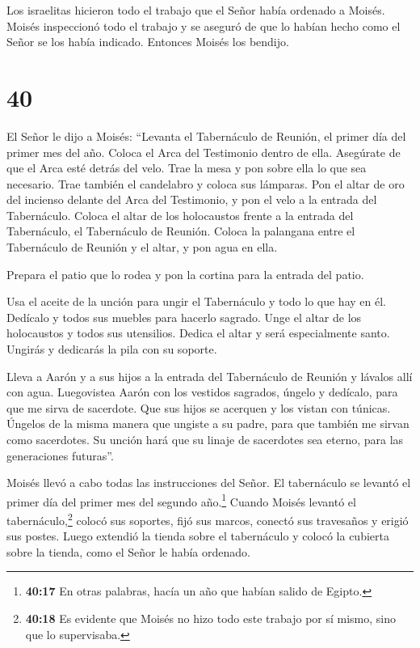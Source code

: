  Los israelitas hicieron todo el trabajo que el Señor había
ordenado a Moisés.  Moisés inspeccionó todo el trabajo y se
aseguró de que lo habían hecho como el Señor se los había indicado.
Entonces Moisés los bendijo.

\hypertarget{section-39}{%
\section{40}\label{section-39}}

 El Señor le dijo a Moisés:  ``Levanta el
Tabernáculo de Reunión, el primer día del primer mes del año.
 Coloca el Arca del Testimonio dentro de ella. Asegúrate de
que el Arca esté detrás del velo.  Trae la mesa y pon sobre
ella lo que sea necesario. Trae también el candelabro y coloca sus
lámparas.  Pon el altar de oro del incienso delante del Arca
del Testimonio, y pon el velo a la entrada del Tabernáculo. 
Coloca el altar de los holocaustos frente a la entrada del Tabernáculo,
el Tabernáculo de Reunión.  Coloca la palangana entre el
Tabernáculo de Reunión y el altar, y pon agua en ella.

 Prepara el patio que lo rodea y pon la cortina para la
entrada del patio.

 Usa el aceite de la unción para ungir el Tabernáculo y todo
lo que hay en él. Dedícalo y todos sus muebles para hacerlo sagrado.
 Unge el altar de los holocaustos y todos sus utensilios.
Dedica el altar y será especialmente santo.  Ungirás y
dedicarás la pila con su soporte.

 Lleva a Aarón y a sus hijos a la entrada del Tabernáculo
de Reunión y lávalos allí con agua.  Luegovistea Aarón con
los vestidos sagrados, úngelo y dedícalo, para que me sirva de
sacerdote.  Que sus hijos se acerquen y los vistan con
túnicas.  Úngelos de la misma manera que ungiste a su
padre, para que también me sirvan como sacerdotes. Su unción hará que su
linaje de sacerdotes sea eterno, para las generaciones futuras''.

 Moisés llevó a cabo todas las instrucciones del Señor.
 El tabernáculo se levantó el primer día del primer mes del
segundo año.\footnote{\textbf{40:17} En otras palabras, hacía un año que
  habían salido de Egipto.}  Cuando Moisés levantó el
tabernáculo,\footnote{\textbf{40:18} Es evidente que Moisés no hizo todo
  este trabajo por sí mismo, sino que lo supervisaba.} colocó sus
soportes, fijó sus marcos, conectó sus travesaños y erigió sus postes.
 Luego extendió la tienda sobre el tabernáculo y colocó la
cubierta sobre la tienda, como el Señor le había ordenado.

